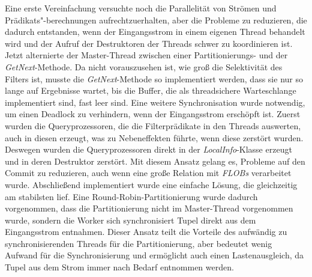 \documentclass[a4paper,12pt,twoside]{article}
\newcommand{\Fb}[1]{\textit{#1}} %
\begin{document}
Eine erste Vereinfachung versuchte noch die Parallelität von Strömen und Prädikats"-berechnungen aufrechtzuerhalten, aber die Probleme zu reduzieren, die dadurch entstanden, wenn der Eingangsstrom in einem eigenen Thread behandelt wird und der Aufruf der Destruktoren der Threads schwer zu koordinieren ist. Jetzt alternierte der Master-Thread zwischen einer Partitionierungs- und der \Fb{GetNext}-Methode. Da nicht vorauszusehen ist, wie groß die Selektivität des Filters ist, musste die \Fb{GetNext}-Methode so implementiert werden, dass sie nur so lange auf Ergebnisse wartet, bis die Buffer, die als threadsichere Warteschlange implementiert sind, fast leer sind. Eine weitere Synchronisation wurde notwendig, um einen Deadlock zu verhindern, wenn der Eingangsstrom erschöpft ist. Zuerst wurden die Queryprozessoren, die die Filterprädikate in den Threads auswerten, auch in diesen erzeugt, was zu Nebeneffekten führte, wenn diese zerstört wurden. Deswegen wurden die Queryprozessoren direkt in der \Fb{LocalInfo}-Klasse erzeugt und in deren Destruktor zerstört. Mit diesem Ansatz gelang es, Probleme auf den Commit zu reduzieren, auch wenn eine große Relation mit \Fb{FLOBs} verarbeitet wurde. Abschließend implementiert wurde eine einfache Lösung, die gleichzeitig am stabilsten lief. Eine Round-Robin-Partitionierung wurde dadurch vorgenommen, dass die Partitionierung nicht im Master-Thread vorgenommen wurde, sondern die Worker sich synchronisiert Tupel direkt aus dem Eingangsstrom entnahmen. Dieser Ansatz teilt die Vorteile des aufwändig zu synchronisierenden Threads für die Partitionierung, aber bedeutet wenig Aufwand für die Synchronisierung und ermöglicht auch einen Lastenausgleich, da Tupel aus dem Strom immer nach Bedarf entnommen werden.
\end{document}
